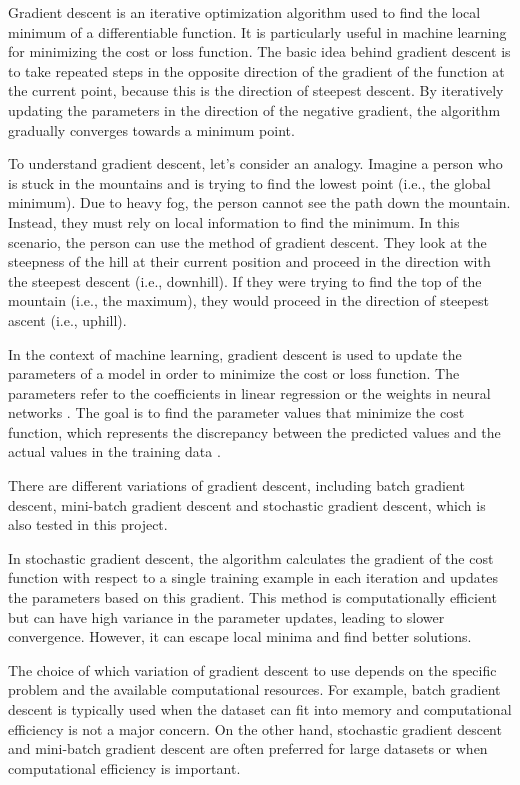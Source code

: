 \documentclass[inscr,ack,preface]{diphdthesis}
\begin{document}
Gradient descent is an iterative optimization algorithm used to find the local minimum of a differentiable function. It is particularly useful in machine learning for minimizing the cost or loss function. The basic idea behind gradient descent is to take repeated steps in the opposite direction of the gradient of the function at the current point, because this is the direction of steepest descent. By iteratively updating the parameters in the direction of the negative gradient, the algorithm gradually converges towards a minimum point\cite{gradient}.

To understand gradient descent, let's consider an analogy. Imagine a person who is stuck in the mountains and is trying to find the lowest point (i.e., the global minimum). Due to heavy fog, the person cannot see the path down the mountain. Instead, they must rely on local information to find the minimum. In this scenario, the person can use the method of gradient descent. They look at the steepness of the hill at their current position and proceed in the direction with the steepest descent (i.e., downhill). If they were trying to find the top of the mountain (i.e., the maximum), they would proceed in the direction of steepest ascent (i.e., uphill).

In the context of machine learning, gradient descent is used to update the parameters of a model in order to minimize the cost or loss function. The parameters refer to the coefficients in linear regression or the weights in neural networks \cite{gradient}. The goal is to find the parameter values that minimize the cost function, which represents the discrepancy between the predicted values and the actual values in the training data \cite{gd}.

There are different variations of gradient descent, including batch gradient descent, mini-batch gradient descent and stochastic gradient descent, which is also tested in this project.

In stochastic gradient descent, the algorithm calculates the gradient of the cost function with respect to a single training example in each iteration and updates the parameters based on this gradient. This method is computationally efficient but can have high variance in the parameter updates, leading to slower convergence. However, it can escape local minima and find better solutions\cite{gradient}.

The choice of which variation of gradient descent to use depends on the specific problem and the available computational resources. For example, batch gradient descent is typically used when the dataset can fit into memory and computational efficiency is not a major concern. On the other hand, stochastic gradient descent and mini-batch gradient descent are often preferred for large datasets or when computational efficiency is important\cite{gd}.
\end{document}

